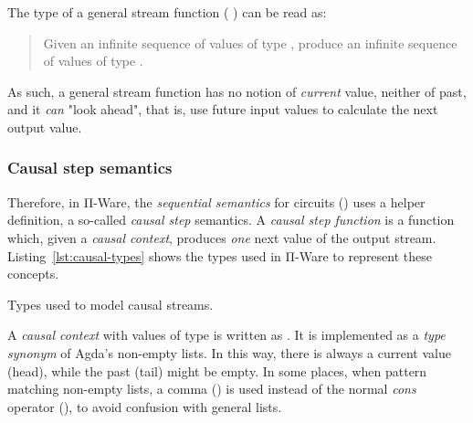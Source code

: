             The type of a general stream function (    )
            can be read as:

            \begin{quote}
                Given an infinite sequence of values of type ,
                produce an infinite sequence of values of type .
            \end{quote}

            As such, a general stream function has no notion of \emph{current} value, neither of past,
            and it \emph{can} "look ahead", that is, use future input values to calculate the next output value.


            \subsubsection{Causal step semantics}
            \label{subsubsec:causal-step-semantics}
            Therefore, in Π-Ware, the \emph{sequential semantics} for circuits () uses a
            helper definition, a so-called \emph{causal step} semantics.
            A \emph{causal step function} is a function which, given a \emph{causal context},
            produces \emph{one} next value of the output stream.
            Listing~\ref{lst:causal-types} shows the types used in Π-Ware to represent these concepts.

            \begin{listing}[h]
                \newline
                \caption{Types used to model causal streams.\label{lst:causal-types}}
            \end{listing}

            A \emph{causal context} with values of type  is written as  .
            It is implemented as a \emph{type synonym} of Agda's non-empty lists.
            In this way, there is always a current value (head), while the past (tail) might be empty.
            In some places, when pattern matching non-empty lists, a comma (\AI{\_,\_}) is used
            instead of the normal \emph{cons} operator (), to avoid confusion with general lists.

